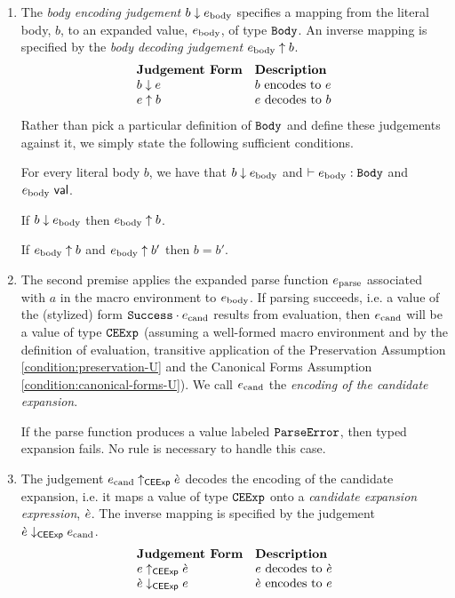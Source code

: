 \begin{enumerate}
\item The \emph{body encoding judgement} $b \downarrow e_\text{body}$ specifies a mapping from the literal body, $b$, to an expanded value, $e_\text{body}$, of type $\mathtt{Body}$. An inverse mapping is specified by the \emph{body decoding judgement} $e_\text{body} \uparrow b$. 
\[\begin{array}{ll}
\textbf{Judgement Form} & \textbf{Description}\\
b \downarrow e & \text{$b$ encodes to $e$}\\
e \uparrow b & \text{$e$ decodes to $b$}
\end{array}\]
Rather than pick a particular definition of $\mathtt{Body}$ and define these judgements against it, we simply state the following sufficient conditions. 
\begin{condition} For every literal body $b$, we have that $b \downarrow e_\text{body}$ and $\vdash e_\text{body} : \mathtt{Body}$ and $e_\text{body}~\mathsf{val}$. \end{condition}
\begin{condition} If $b \downarrow e_\text{body}$ then $e_\text{body} \uparrow b$. \end{condition}
\begin{condition} If $e_\text{body} \uparrow b$ and $e_\text{body} \uparrow b'$ then $b=b'$. \end{condition}

\item The second premise applies the expanded parse function $e_\text{parse}$ associated with $a$ in the macro environment to $e_\text{body}$. If parsing succeeds, i.e. a value of the (stylized) form $\mathtt{Success} \cdot e_\text{cand}$ results from evaluation, then $e_\text{cand}$ will be a value of type $\mathtt{CEExp}$ (assuming a well-formed macro environment and by the definition of evaluation, transitive application of the Preservation Assumption \ref{condition:preservation-U} and the Canonical Forms Assumption \ref{condition:canonical-forms-U}). We call $e_\text{cand}$ the \emph{encoding of the candidate expansion}.

If the parse function produces a value labeled $\mathtt{ParseError}$, then typed expansion fails. No rule is necessary to handle this case. 

\item The judgement $e_\text{cand} \uparrow_\mathsf{CEExp} \grave{e}$ decodes the encoding of the candidate expansion, i.e. it maps a value of type $\mathtt{CEExp}$ onto a \emph{candidate expansion expression}, $\grave{e}$. The inverse mapping is specified by the judgement $\grave{e} \downarrow_\mathsf{CEExp} e_\text{cand}$. 
\[\begin{array}{ll}
\textbf{Judgement Form} & \textbf{Description}\\
e \uparrow_\mathsf{CEExp} \grave{e} & \text{$e$ decodes to $\grave{e}$}\\
\grave{e} \downarrow_\mathsf{CEExp} e & \text{$\grave{e}$ encodes to $e$}
\end{array}\]


\end{enumerate}
